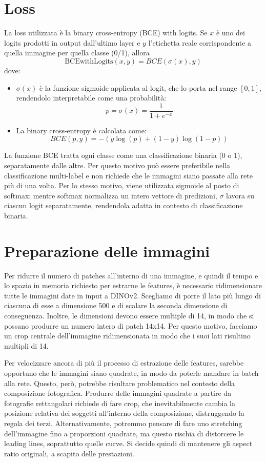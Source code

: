 \section{Loss}
La loss utilizzata è la binary cross-entropy (BCE) with logits. Se \(x\) è uno dei logits prodotti in output dall'ultimo layer e \(y\) l'etichetta reale corrispondente a quella immagine per quella classe (0/1), allora
\begin{equation}
    \text{BCEwithLogits}(x, y) = BCE(\sigma(x), y)
\end{equation}
dove:
\begin{itemize}
    \item \(\sigma(x)\) è la funzione sigmoide applicata al logit, che lo porta nel range \([0, 1]\), rendendolo interpretabile come una probabilità:
    \begin{equation}
        p  = \sigma(x) = \frac{1}{1 + e^{-x}}
    \end{equation}
    \item La binary cross-entropy è calcolata come:
    \begin{equation}
        BCE(p, y) = -(y\log(p) + (1-y)\log(1-p))
    \end{equation}
\end{itemize}
La funzione BCE tratta ogni classe come una classificazione binaria (0 o 1), separatamente dalle altre. Per questo motivo può essere preferibile nella classificazione multi-label e non richiede che le immagini siano passate alla rete più di una volta. Per lo stesso motivo, viene utilizzata sigmoide al posto di softmax: mentre softmax normalizza un intero vettore di predizioni, \(\sigma\) lavora su ciascun logit separatamente, rendendola adatta in contesto di classificazione binaria.


\section{Preparazione delle immagini}
Per ridurre il numero di patches all'interno di una immagine, e quindi il tempo e lo spazio in memoria richiesto per estrarne le features, è necessario ridimensionare tutte le immagini date in input a DINOv2. Scegliamo di porre il lato più lungo di ciascuna di esse a dimensione 500 e di scalare la seconda dimensione di conseguenza. Inoltre, le dimensioni devono essere multiple di 14, in modo che si possano produrre un numero intero di patch 14x14. Per questo motivo, facciamo un crop centrale dell'immagine ridimensionata in modo che i suoi lati risultino multipli di 14.

Per velocizzare ancora di più il processo di estrazione delle features, sarebbe opportuno che le immagini siano quadrate, in modo da poterle mandare in batch alla rete. Questo, però, potrebbe risultare problematico nel contesto della composizione fotografica. Produrre delle immagini quadrate a partire da fotografie rettangolari richiede di fare crop, che inevitabilmente cambia la posizione relativa dei soggetti all'interno della composizione, distruggendo la regola dei terzi. Alternativamente, potremmo pensare di fare uno stretching dell'immagine fino a proporzioni quadrate, ma questo rischia di distorcere le leading lines, soprattutto quelle curve. Si decide quindi di mantenere gli aspect ratio originali, a scapito delle prestazioni.